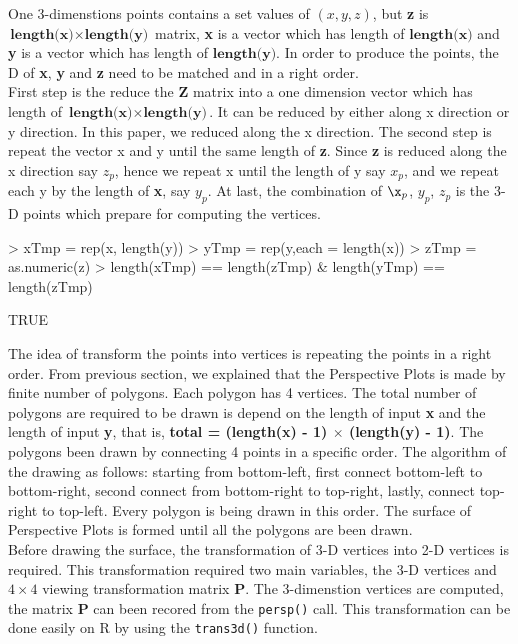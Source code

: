 \documentclass[paper=a4, fontsize=11pt]{report}
\begin{document}
One 3-dimenstions points contains a set values of $(x, y, z)$, but \textbf{z} is $\textbf{length(x)} \times \textbf{length(y)}$ matrix, \textbf{x} is a vector which has length of $\textbf{length(x)}$ and \textbf{y} is a vector which has length of $\textbf{length(y)}$. In order to produce the points, the D of \textbf{x}, \textbf{y} and \textbf{z} need to be matched and in a right order.\\

First step is the reduce the \textbf{Z} matrix into a one dimension vector which has length of $\textbf{length(x)} \times \textbf{length(y)}$. It can be reduced by either along x direction or y direction. In this paper, we reduced along the x direction. The second step is repeat the vector x and y until the same length of \textbf{z}. Since \textbf{z} is reduced along the x direction say $z_p$, hence we repeat x until the length of y say $x_p$, and we repeat each y by the length of \textbf{x}, say $y_p$. At last, the combination of $\x_p$, $y_p$, $z_p$ is the 3-D points which prepare for computing the vertices. \\
\begin{Schunk}
\begin{Sinput}
> xTmp = rep(x, length(y))
> yTmp = rep(y,each = length(x))
> zTmp = as.numeric(z)
> length(xTmp) == length(zTmp) & length(yTmp) == length(zTmp)
\end{Sinput}
\begin{Soutput}
[1] TRUE
\end{Soutput}
\end{Schunk}

The idea of transform the points into vertices is repeating the points in a right order. From previous section, we explained that the Perspective Plots is made by finite number of polygons. Each polygon has 4 vertices. The total number of polygons are required to be drawn is depend on the length of input \textbf{x} and the length of input \textbf{y}, that is, \textbf{total = (length(x) - 1) $\times$ (length(y) - 1)}. The polygons been drawn by connecting 4 points in a specific order. The algorithm of the drawing as follows: starting from bottom-left, first connect bottom-left to bottom-right, second connect from bottom-right to top-right, lastly, connect top-right to top-left. Every polygon is being drawn in this order. The surface of Perspective Plots is formed until all the polygons are been drawn. \\

Before drawing the surface, the transformation of 3-D vertices into 2-D vertices is required. This transformation required two main variables, the 3-D vertices and $4 \times 4$ viewing transformation matrix \textbf{P}. The 3-dimenstion vertices are computed, the matrix \textbf{P} can been recored from the \texttt{persp()} call. This transformation can be done easily on R by using the \texttt{trans3d()} function.
\end{document}
